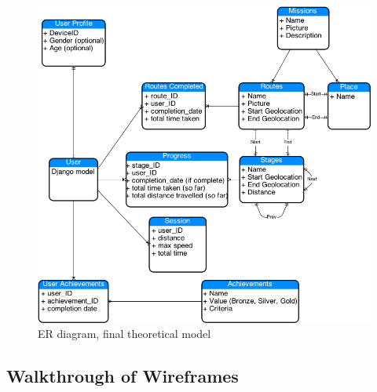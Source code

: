 \begin{figure}[H]
  \centering
  \includegraphics[width=\textwidth]{images/ER.png}
  \caption{ER diagram, final theoretical model}
  \label{ER_1}
\end{figure}




\subsection{Walkthrough of Wireframes}

